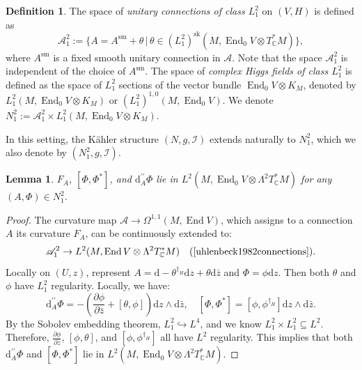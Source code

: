 \documentclass[a4paper]{amsart}
\newtheorem{lemma}[theorem]{Lemma}
\theoremstyle{definition}
\newtheorem{definition}[theorem]{Definition}
\theoremstyle{remark}
\numberwithin{equation}{section}
\begin{document}
\begin{definition}
The space of \textit{unitary connections of class $L_1^2$} on $(V, H)$ is defined as  
\[
\mathscr{A}_1^2 := \Big\{ A = A^{\text{sm}} + \theta \,\Big|\, \theta \in (L_1^2)^{\text{sk}}(M, \operatorname{End}_0 V \otimes T^*_\mathbb{C} M) \Big\},
\]
where $A^{\text{sm}}$ is a fixed smooth unitary connection in $\mathscr{A}$. Note that the space $\mathscr{A}_1^2$ is independent of the choice of $A^{\text{sm}}$. The space of \textit{complex Higgs fields of class $L_1^2$} is defined as the space of $L_1^2$ sections of the vector bundle $\operatorname{End}_0 V \otimes K_M$, denoted by $L_1^2(M, \operatorname{End}_0 V \otimes K_M)$ or $(L_1^2)^{1,0}(M, \operatorname{End}_0 V)$. We denote $N_1^2 := \mathscr{A}_1^2 \times L_1^2(M, \operatorname{End}_0 V \otimes K_M)$. 
\end{definition}
In this setting, the Kähler structure $(N, g, \mathcal{I})$ extends naturally to $N_1^2$, which we also denote by $(N_1^2, g, \mathcal{I})$. 
\begin{lemma}
$F_A$, $[\Phi, \Phi^*]$, and $\mathrm{d}_A^{\prime\prime} \Phi$ lie in $L^2(M, \operatorname{End}_0 V \otimes \Lambda^2 T_\mathbb{C}^* M)$ for any $(A, \Phi) \in N_1^2$.
\end{lemma}

\begin{proof}
The curvature map $\mathscr{A} \to \Omega^{1,1}(M, \operatorname{End} V)$, which assigns to a connection $A$ its curvature $F_A$, can be continuously extended to:  
\[
\mathscr{A}_1^2 \to L^2(M, \operatorname{End} V \otimes \Lambda^2 T^*_\mathbb{C} M) \quad \text{(\cite[Lemma~1.1]{uhlenbeck1982connections}).}
\]
Locally on $(U, z)$, represent $A = \mathrm{d} - \theta^{\dagger_H} \mathrm{d}z + \theta \mathrm{d}\bar{z}$ and $\Phi = \phi \mathrm{d}z$. Then both $\theta$ and $\phi$ have $L_1^2$ regularity. Locally, we have:
\[
\mathrm{d}_A^{\prime\prime} \Phi = -\left(\frac{\partial \phi}{\partial \bar z} + [\theta, \phi]\right) \mathrm{d}z \wedge \mathrm{d}\bar{z}, \quad 
[\Phi, \Phi^*] = [\phi, \phi^{\dagger_H}] \mathrm{d}z \wedge \mathrm{d}\bar{z}.
\]
By the Sobolev embedding theorem, $L_1^2 \hookrightarrow L^4$, and we know $L_1^2 \times L_1^2 \subseteq L^2$. Therefore, $\frac{\partial \phi}{\partial \bar z}$, $[\phi, \theta]$, and $[\phi, \phi^{\dagger_H}]$ all have $L^2$ regularity. This implies that both $\mathrm{d}_A^{\prime\prime} \Phi$ and $[\Phi, \Phi^*]$ lie in $L^2(M, \operatorname{End}_0 V \otimes \Lambda^2 T_\mathbb{C}^* M)$.
\end{proof}
\end{document}
